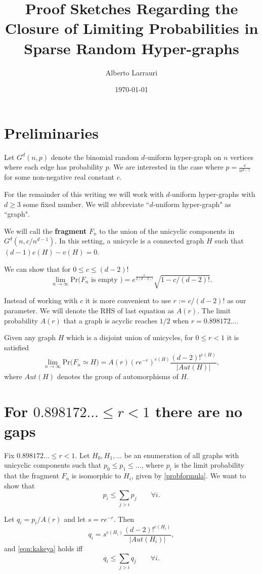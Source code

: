 \documentclass[11pt,notitlepage,a4paper]{article}
\title{Proof Sketches Regarding the Closure of 
	Limiting Probabilities in Sparse Random Hyper-graphs}
\date{\today}
\author{Alberto Larrauri}
\theoremstyle{definition}
\newcommand{\Ln}{\lim\limits_{n\to \infty}}
\begin{document}
	\maketitle
	
\section*{Preliminaries}

Let $G^d(n,p)$ denote the binomial random $d$-uniform hyper-graph on $n$ 
vertices where each edge has probability $p$. We are interested in 
the case where $p=\frac{c}{n^{d-1}}$ for some non-negative real constant $c$.
\par
For the remainder of this writing we will work with $d$-uniform hyper-graphs
with $d\geq 3$ some fixed number. We will abbreviate ``$d$-uniform hyper-graph"
as ``graph".
\par

We will call the \textbf{fragment} $F_n$ to the union of the unicyclic 
components in $G^d(n,c/n^{d-1})$. In this setting, a unicycle is a connected
graph $H$ such that $(d-1)e(H)-v(H)=0$. 
\par


We can show that for $0\leq c \leq (d-2)!$
\[ \Ln \mathrm{Pr}\big( F_n \text{ is empty }\big)= e^{\frac{c}{2(d-2)!}}\sqrt{1 - c/(d-2)!}.\]

Instead of working with $c$ it is more convenient to use $r:= c/(d-2)!$
as our parameter. We will denote the RHS of last equation as $A(r)$. 
The limit probability $A(r)$ that a graph is acyclic reaches $1/2$ when
$r=0.898172...$.\par

Given any graph $H$ which is a disjoint union of unicycles, 
for $0\leq r < 1$ it is satisfied
\begin{equation} \label{probformula}
\Ln \mathrm{Pr}\big( F_n\simeq H \big)= A(r)(re^{-r})^{e(H)}
\frac{(d-2)!^{e(H)}}{|Aut(H)|},
\end{equation}
where $Aut(H)$ denotes the group of automorphisms of $H$.  \par 

\section*{For $0.898172...\leq r < 1$ there are no gaps}

Fix $0.898172...\leq r < 1$.
Let $H_0,H_1,\dots$ be an enumeration of all graphs with 
unicyclic components such that $p_0 \leq p_1 \leq \dots$,
where $p_i$ is the limit probability that the fragment 
$F_n$ is isomorphic to $H_i$, given by \cref{probformula}.
We want to show that
\begin{equation} \label{eqn:kakeya}
	p_i \leq \sum_{j>i} p_j \qquad \forall i.
\end{equation} 
\par
Let $q_i=p_i/A(r)$ and let $s=re^{-r}$. Then
 \[ q_i= s^{e(H_i)}
 \frac{(d-2)!^{e(H_i)}}{|Aut(H_i)|},
 \]
and \cref{eqn:kakeya} holds iff
\begin{equation} \label{eqn:kakeya2}
q_i \leq \sum_{j>i} q_j \qquad \forall i. 
\end{equation}
\end{document}
